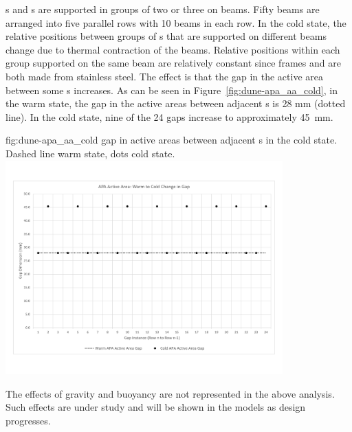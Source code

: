 s and s are supported in groups of two or three
on  beams. Fifty beams are arranged into five parallel rows
with 10 beams in each row.  In the cold state, the relative positions
between groups of s that are supported on different beams
change due to thermal contraction of the beams. Relative positions
within each group supported on the same beam are relatively constant
since  frames and  are both made from stainless
steel.  The effect is that the gap in the active area between some
s increases.  As can be seen in
Figure~\ref{fig:dune-apa_aa_cold}, in the warm state, the gap in the
active areas between adjacent s is 28 mm (dotted line). In
the cold state, nine of the 24 gaps increase to approximately 45~mm.
\begin{dunefigure}{fig:dune-apa_aa_cold} 
    { gap in active areas between adjacent s
      in the cold state. Dashed line warm state, dots cold state.}
    \includegraphics[width=0.8\textwidth]{graphics/apa_aa_gap_change.pdf}
\end{dunefigure}

The effects of gravity and buoyancy are not represented in the above
analysis. Such effects are under study and will be shown in the models
as design progresses.

